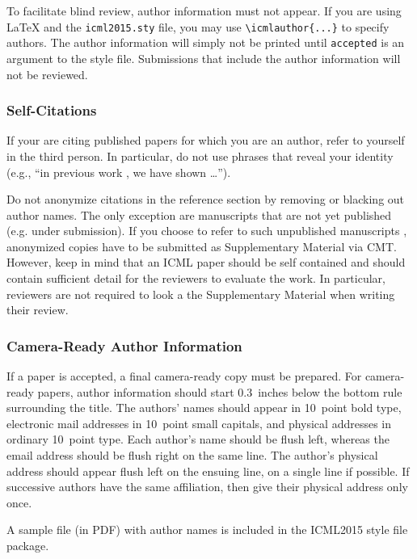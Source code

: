 \documentclass{article}
\begin{document}
To facilitate blind review, author information must not appear.  If
you are using \LaTeX\/ and the \texttt{icml2015.sty} file, you may use
\verb+\icmlauthor{...}+ to specify authors.  The author information
will simply not be printed until {\tt accepted} is an argument to the
style file. Submissions that include the author information will not
be reviewed.

\subsubsection{Self-Citations}

If your are citing published papers for which you are an author, refer
to yourself in the third person. In particular, do not use phrases
that reveal your identity (e.g., ``in previous work \cite{langley00}, we 
have shown \ldots'').

Do not anonymize citations in the reference section by removing or
blacking out author names. The only exception are manuscripts that are
not yet published (e.g. under submission). If you choose to refer to
such unpublished manuscripts \cite{anonymous}, anonymized copies have 
to be submitted
as Supplementary Material via CMT. However, keep in mind that an ICML
paper should be self contained and should contain sufficient detail
for the reviewers to evaluate the work. In particular, reviewers are
not required to look a the Supplementary Material when writing their
review.

\subsubsection{Camera-Ready Author Information}
\label{final author}

If a paper is accepted, a final camera-ready copy must be prepared.
%
For camera-ready papers, author information should start 0.3~inches
below the bottom rule surrounding the title. The authors' names should
appear in 10~point bold type, electronic mail addresses in 10~point
small capitals, and physical addresses in ordinary 10~point type.
Each author's name should be flush left, whereas the email address
should be flush right on the same line. The author's physical address
should appear flush left on the ensuing line, on a single line if
possible. If successive authors have the same affiliation, then give
their physical address only once.

A sample file (in PDF) with author names is included in the ICML2015 
style file package.
\end{document}
